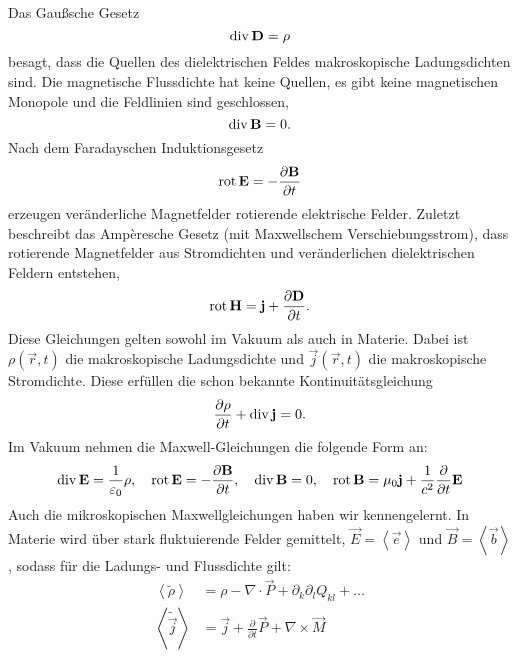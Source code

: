 Das Gaußsche Gesetz
\begin{equation*}
	\operatorname{div} \mathbf{D}=\rho
\end{equation*}
besagt, dass die Quellen des dielektrischen Feldes makroskopische Ladungsdichten sind. Die magnetische Flussdichte hat keine Quellen, es gibt keine magnetischen Monopole und die Feldlinien sind geschlossen,
\begin{equation*}
	\operatorname{div} \mathbf{B}=0.
\end{equation*}
Nach dem Faradayschen Induktionsgesetz
\begin{equation*}
	\operatorname{rot} \mathbf{E}=-\frac{\partial \mathbf{B}}{\partial t}
\end{equation*}
erzeugen veränderliche Magnetfelder rotierende elektrische Felder. Zuletzt beschreibt das Ampèresche Gesetz (mit Maxwellschem Verschiebungsstrom), dass rotierende Magnetfelder aus Stromdichten und veränderlichen dielektrischen Feldern entstehen,
\begin{equation*}
	\operatorname{rot} \mathbf{H}=\mathbf{j}+\frac{\partial \mathbf{D}}{\partial t}.
\end{equation*}
Diese Gleichungen gelten sowohl im Vakuum als auch in Materie. Dabei ist $\rho \left(\vec {r},t\right)$ die makroskopische Ladungsdichte und $\vec {j}\left(\vec {r},t\right)$ die makroskopische Stromdichte. Diese erfüllen die schon bekannte Kontinuitätsgleichung
\begin{equation*}
	\frac{\partial \rho }{\partial t}+\operatorname{div} \mathbf{j}=0.
\end{equation*}
Im Vakuum nehmen die Maxwell-Gleichungen die folgende Form an:
\begin{equation*}
	\operatorname{div} \mathbf{E}=\frac{1}{\varepsilon _{0}}\rho ,\quad \operatorname{rot} \mathbf{E}=-\frac{\partial \mathbf{B}}{\partial t},\quad \operatorname{div} \mathbf{B}=0,\quad \operatorname{rot} \mathbf{B}=\mu _{0}\mathbf{j}+\frac{1}{c^{2}}\frac{\partial }{\partial t}\mathbf{E}
\end{equation*}
Auch die mikroskopischen Maxwellgleichungen haben wir kennengelernt. In Materie wird über stark fluktuierende Felder gemittelt, $\vec {E}=\left\langle \vec {e}\right\rangle $ und $\vec {B}=\left\langle \vec {b}\right\rangle $, sodass für die Ladungs- und Flussdichte gilt:
\begin{align*}
	\left\langle \tilde{\rho }\right\rangle    & =\rho -\nabla \cdot \vec {P}+\partial _{k}\partial _{l}Q_{kl}+\ldots  \\
	\left\langle \tilde{\vec {j}}\right\rangle & =\vec {j}+\frac{\partial }{\partial t}\vec {P}+\nabla \times \vec {M}
\end{align*}
